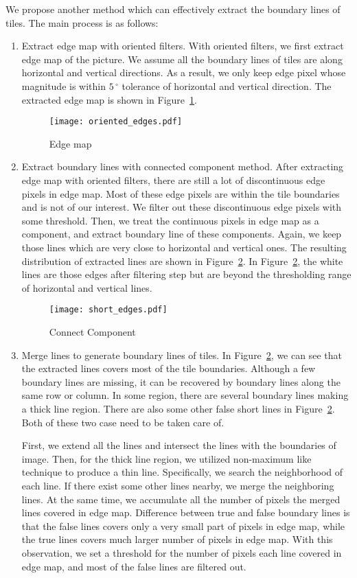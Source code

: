 We propose another method which can effectively extract the boundary lines of
tiles. The main process is as follows: \begin{enumerate} \item Extract edge map
with oriented filters. With oriented filters, we first extract edge map of the
picture. We assume all the boundary lines of tiles are along horizontal and
vertical directions. As a result, we only keep edge pixel whose magnitude is
within $5\,^{\circ}$ tolerance of horizontal and vertical direction. The
extracted edge map is shown in Figure~\ref{Edge_map}.

\begin{figure}[htbp]
\centering
\texttt{[image: oriented\_edges.pdf]}
\caption{Edge map}
\label{Edge_map}
\end{figure}

\item Extract boundary lines with connected component method. After extracting
edge map with oriented filters, there are still a lot of discontinuous edge
pixels in edge map. Most of these edge pixels are within the tile boundaries and
is not of our interest. We filter out these discontinuous edge pixels with some
threshold. Then, we treat the continuous pixels in edge map as a component, and
extract boundary line of these components. Again, we keep those lines which are
very close to horizontal and vertical ones. The resulting distribution of
extracted lines are shown in Figure~\ref{Connect}. In Figure~\ref{Connect}, the
white lines are those edges after filtering step but are beyond the thresholding
range of horizontal and vertical lines.

\begin{figure}[htbp] \centering
\texttt{[image: short\_edges.pdf]}
\caption{Connect Component}
\label{Connect}
\end{figure}

\item Merge lines to generate boundary lines of tiles. In Figure~\ref{Connect},
we can see that the extracted lines covers most of the tile boundaries. Although
a few boundary lines are missing, it can be recovered by boundary lines along
the same row or column. In some region, there are several boundary lines making
a thick line region. There are also some other false short lines in
Figure~\ref{Connect}. Both of these two case need to be taken care of.

First, we extend all the lines and intersect the lines with the boundaries of
image. Then, for the thick line region, we utilized non-maximum like technique
to produce a thin line. Specifically, we search the neighborhood of each line.
If there exist some other lines nearby, we merge the neighboring lines. At the
same time, we accumulate all the number of pixels the merged lines covered in
edge map. Difference between true and false boundary lines is that the false
lines covers only a very small part of pixels in edge map, while the true lines
covers much larger number of pixels in edge map. With this observation, we set a
threshold for the number of pixels each line covered in edge map, and most of
the false lines are filtered out.


\end{enumerate}
